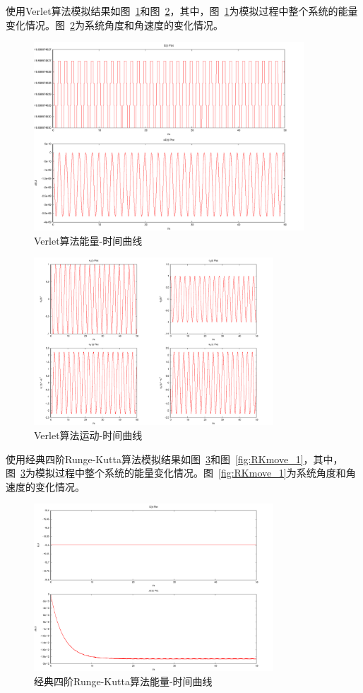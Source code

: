 \documentclass[a4paper,12pt,titlepage]{article}
\begin{document}
使用Verlet算法模拟结果如图~\ref{fig:verletE}和图~\ref{fig:verletmove}，其中，图~\ref{fig:verletE}为模拟过程中整个系统的能量变化情况。图~\ref{fig:verletmove}为系统角度和角速度的变化情况。
\begin{figure}[H]
\centering
\includegraphics[width=0.9\textwidth]{./verletE.pdf}
\caption[Caption for LOF]{Verlet算法能量-时间曲线}
\label{fig:verletE}
\end{figure}
\begin{figure}[H]
\centering
\includegraphics[width=0.8\textwidth]{./verletmove.pdf}
\caption[Caption for LOF]{Verlet算法运动-时间曲线}
\label{fig:verletmove}
\end{figure}
使用经典四阶Runge-Kutta算法模拟结果如图~\ref{fig:RKE_1}和图~\ref{fig:RKmove_1}，其中，图~\ref{fig:RKE_1}为模拟过程中整个系统的能量变化情况。图~\ref{fig:RKmove_1}为系统角度和角速度的变化情况。
\begin{figure}[H]
\centering
\includegraphics[width=0.8\textwidth]{./RKE_1.pdf}
\caption[Caption for LOF]{经典四阶Runge-Kutta算法能量-时间曲线}
\label{fig:RKE_1}
\end{figure}
\end{document}
